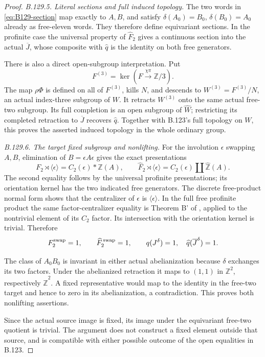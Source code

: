 \begin{proof}
\emph{B.129.5. Literal sections and full induced topology.}
The two words in \eqref{eq:B129-section} map exactly to \(A,B\),
and satisfy \(\delta(A_0)=B_0\), \(\delta(B_0)=A_0\) already
as free-eleven words. They therefore define equivariant
sections. In the profinite case the universal property of
\(\widehat F_2\) gives a continuous section into the actual
\(\overline J\), whose composite with \(\widehat q\) is the
identity on both free generators.

There is also a direct open-subgroup interpretation. Put
\[
 F^{(3)}=\ker(F\xrightarrow{\chi\pi}\mathbb Z/3).
\]
The map \(\rho\Phi\) is defined on all of \(F^{(3)}\), kills
\(N\), and descends to \(W^{(3)}=F^{(3)}/N\), an actual
index-three subgroup of \(W\). It retracts \(W^{(3)}\) onto
the same actual free-two subgroup. Its full completion is
an open subgroup of \(\widehat W\); restricting its completed
retraction to \(\overline J\) recovers \(\widehat q\).
Together with B.123's full topology on \(W\), this proves the
asserted induced topology in the whole ordinary group.

\emph{B.129.6. The target fixed subgroup and nonlifting.}
For the involution \(\epsilon\) swapping \(A,B\), elimination
of \(B=\epsilon A\epsilon\) gives the exact presentations
\[
 F_2\rtimes\langle\epsilon\rangle
       =C_2(\epsilon)*\mathbb Z(A),\qquad
 \widehat F_2\rtimes\langle\epsilon\rangle
       =C_2(\epsilon)\amalg\widehat{\mathbb Z}(A).
\]
The second equality follows by the universal profinite
presentations; its orientation kernel has the two indicated
free generators. The discrete free-product normal form
shows that the centralizer of \(\epsilon\) is
\(\langle\epsilon\rangle\). In the full free profinite product
the same factor-centralizer equality is Theorem B' of
\citet{A_HR1985}, applied to the nontrivial element of its
\(C_2\) factor. Its intersection with the orientation kernel
is trivial. Therefore
\[
 F_2^{\rm swap}=1,\qquad
 \widehat F_2^{\,\rm swap}=1,\qquad
 q(J^\delta)=1,\quad
 \widehat q(\overline J^\delta)=1.
\]

The class of \(A_0B_0\) is invariant in either actual
abelianization because \(\delta\) exchanges its two factors.
Under the abelianized retraction it maps to \((1,1)\) in
\(\mathbb Z^2\), respectively \(\widehat{\mathbb Z}^2\).
A fixed representative would map to the identity in the
free-two target and hence to zero in its abelianization,
a contradiction. This proves both nonlifting assertions.

Since the actual source image is fixed, its image under the
equivariant free-two quotient is trivial. The argument does
not construct a fixed element outside that source, and is
compatible with either possible outcome of the open equalities
in B.123.
\end{proof}

